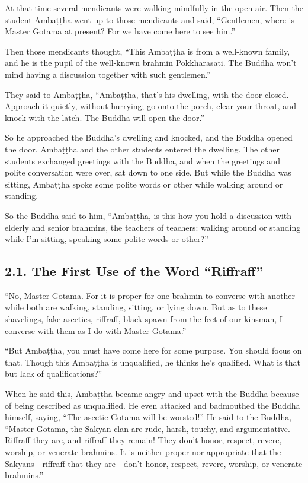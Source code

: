 \documentclass[12pt,openany]{book}%
\begin{document}
At that time several mendicants were walking mindfully in the open air. Then the student \textsanskrit{Ambaṭṭha} went up to those mendicants and said, “Gentlemen, where is Master Gotama at present? For we have come here to see him.” 

Then those mendicants thought, “This \textsanskrit{Ambaṭṭha} is from a well-known family, and he is the pupil of the well-known brahmin \textsanskrit{Pokkharasāti}. The Buddha won’t mind having a discussion together with such gentlemen.” 

They said to \textsanskrit{Ambaṭṭha}, “\textsanskrit{Ambaṭṭha}, that’s his dwelling, with the door closed. Approach it quietly, without hurrying; go onto the porch, clear your throat, and knock with the latch. The Buddha will open the door.” 

So he approached the Buddha’s dwelling and knocked, and the Buddha opened the door. \textsanskrit{Ambaṭṭha} and the other students entered the dwelling. The other students exchanged greetings with the Buddha, and when the greetings and polite conversation were over, sat down to one side. But while the Buddha was sitting, \textsanskrit{Ambaṭṭha} spoke some polite words or other while walking around or standing. 

So the Buddha said to him, “\textsanskrit{Ambaṭṭha}, is this how you hold a discussion with elderly and senior brahmins, the teachers of teachers: walking around or standing while I’m sitting, speaking some polite words or other?” 

\subsection*{2.1. The First Use of the Word “Riffraff” }

“No, Master Gotama. For it is proper for one brahmin to converse with another while both are walking, standing, sitting, or lying down. But as to these shavelings, fake ascetics, riffraff, black spawn from the feet of our kinsman, I converse with them as I do with Master Gotama.” 

“But \textsanskrit{Ambaṭṭha}, you must have come here for some purpose. You should focus on that. Though this \textsanskrit{Ambaṭṭha} is unqualified, he thinks he’s qualified. What is that but lack of qualifications?” 

When he said this, \textsanskrit{Ambaṭṭha} became angry and upset with the Buddha because of being described as unqualified. He even attacked and badmouthed the Buddha himself, saying, “The ascetic Gotama will be worsted!” He said to the Buddha, “Master Gotama, the Sakyan clan are rude, harsh, touchy, and argumentative. Riffraff they are, and riffraff they remain! They don’t honor, respect, revere, worship, or venerate brahmins. It is neither proper nor appropriate that the Sakyans—riffraff that they are—don’t honor, respect, revere, worship, or venerate brahmins.” 
\end{document}
